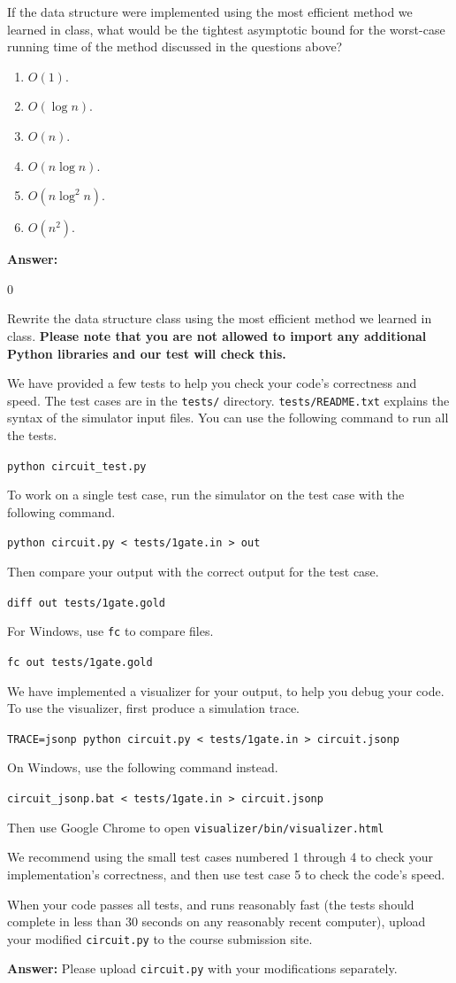 \documentclass[12pt,twoside]{article}
\newcommand{\answer}{
 \par\medskip
 \textbf{Answer:}
}
\newcommand{\answerIId}{ \answer
0
}
\begin{document}
\begin{problems}
\begin{problemparts}
\problempart {} If the data structure were implemented using the most
efficient method we learned in class, what would be the tightest asymptotic
bound for the worst-case running time of the method discussed in the questions
above?
\begin{enumerate}
  \item $O(1)$.
  \item $O(\log n)$.
  \item $O(n)$.
  \item $O(n \log n)$.
  \item $O(n \log^2 n)$.
  \item $O(n^2)$.
\end{enumerate}
\answerIId

\problempart {} Rewrite the data structure class using the most
efficient method we learned in class. \textbf{Please note that you are not
allowed to import any additional Python libraries and our test will check this.}

We have provided a few tests to help you check your code's correctness and
speed. The test cases are in the \texttt{tests/} directory.
\texttt{tests/README.txt} explains the syntax of the simulator input files. You
can use the following command to run all the tests.

\texttt{python circuit\_test.py}

To work on a single test case, run the simulator on the test case with the
following command.

\texttt{python circuit.py < tests/1gate.in > out}

Then compare your output with the correct output for the test case.

\texttt{diff out tests/1gate.gold}

For Windows, use \texttt{fc} to compare files.

\texttt{fc out tests/1gate.gold}

We have implemented a visualizer for your output, to help you debug your code.
To use the visualizer, first produce a simulation trace.

\texttt{TRACE=jsonp python circuit.py < tests/1gate.in > circuit.jsonp}

On Windows, use the following command instead.

\texttt{circuit\_jsonp.bat < tests/1gate.in > circuit.jsonp}

Then use Google Chrome to open
\texttt{visualizer/bin/visualizer.html}

We recommend using the small test cases numbered 1 through 4 to check your
implementation's correctness, and then use test case 5 to check the code's
speed.

When your code passes all tests, and runs reasonably fast (the tests should
complete in less than 30 seconds on any reasonably recent computer), upload your
modified \texttt{circuit.py} to the course submission site.

\answer {
  Please upload \texttt{circuit.py} with your modifications separately.
}

\end{problemparts}

\end{problems}
\end{document}
